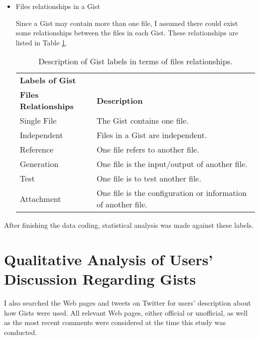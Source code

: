 \begin{itemize}
  \item Files relationships in a Gist

  Since a Gist may contain more than one file, I assumed there could exist some relationships between the files in each Gist. These relationships are listed in Table \ref{tb:gistfilerelationshiplabels}.

\begin{table}[!htb]
 \begin{center}
 \begin{tabular}{ll} 
    \textbf{Labels of Gist}	&	\\ 
    \textbf{Files Relationships}	& \textbf{Description}	\\  \hline
    Single File & The Gist contains one file.\\
    Independent & Files in a Gist are independent.\\
    Reference & One file refers to another file.\\ 
    Generation & One file is the input/output of another file.\\ 
    Test & One file is to test another file.\\ 
    Attachment & One file is the configuration or information of another file.\\ \hline
 \end{tabular}
 \end{center}
 \caption{Description of Gist labels in terms of files relationships.}
 \label{tb:gistfilerelationshiplabels}
\end{table}

\end{itemize}

After finishing the data coding, statistical analysis was made against these labels.

\section{Qualitative Analysis of Users' Discussion Regarding Gists}

I also searched the Web pages and tweets on Twitter for users' description about how Gists were used. All relevant Web pages, either official or unofficial, as well as the most recent comments were considered at the time this study was conducted. 

